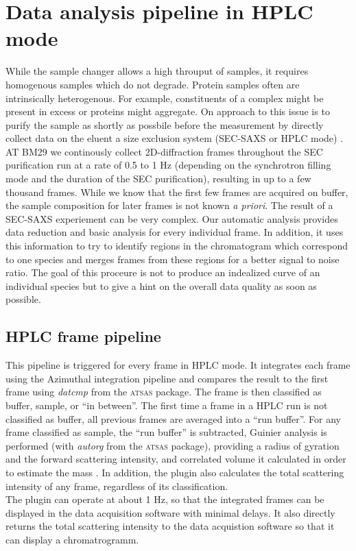 \documentclass[preprint,pdf]{iucr}              %
\begin{document}
\section{Data analysis pipeline in HPLC mode}
While the sample changer allows a high throuput of samples, it requires homogenous samples which do not degrade. Protein samples often are intrinsically heterogenous. For example, constituents of a complex might be present in excess or proteins might aggregate. On approach to this issue is to purify the sample as shortly as possbile before the measurement by directly collect data on the eluent a size exclusion system (SEC-SAXS or HPLC mode) \cite{SECBM29,otherSEC}. AT BM29 we continously collect 2D-diffraction frames throughout the SEC purification run at a rate of 0.5 to 1 Hz (depending on the synchrotron filling mode and the duration of the SEC purification), resulting in up to a few thousand frames. While we know that the first few frames are acquired on buffer, the sample composition for later frames is not known \textit{a priori}. The result of a SEC-SAXS experiement can be very complex. Our automatic analysis provides data reduction and basic analysis for every individual frame. In addition, it uses this information to try to identify regions in the chromatogram which correspond to one species and merges frames from these regions for a better signal to noise ratio. The goal of this proceure is not to produce an indealized curve of an individual species but to give a hint on the overall data quality as soon as possible.

\subsection{HPLC frame pipeline}

This pipeline is triggered for every frame in HPLC mode. It integrates each frame using the Azimuthal integration pipeline and compares the result to the first frame using \textit{datcmp} from the \textsc{atsas} package. The frame is then classified as buffer, sample, or ``in between''. The first time a frame in a HPLC run is not classified as buffer, all previous frames are averaged into a ``run buffer''.
For any frame classified as sample, the ``run buffer'' is subtracted, Guinier analysis is performed (with \textit{autorg} from the \textsc{atsas} package), providing a radius of gyration and the forward scattering intensity, and correlated volume it calculated in order to estimate the mass \cite{RamboTainerNature2013}. In addition, the plugin also calculates the total scattering intensity of any frame, regardless of its classification. \\
The plugin can operate at about 1 Hz, so that the integrated frames can be displayed in the data acquisition software with minimal delays. It also directly returns the total scattering intensity to the data acquistion software so that it can display a chromatrogramm.
\end{document}
